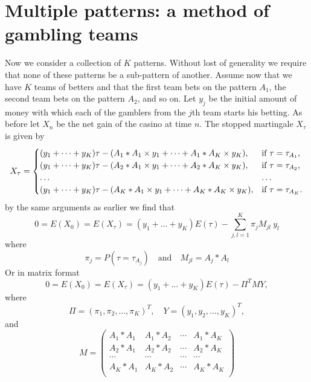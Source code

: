 \section{Multiple patterns: a method of gambling teams}
Now we consider a collection of $K$ patterns. Without lost of generality we
require that none of these patterns be a sub-pattern of another. Assume now that
we have $K$ teams of betters and that the first team bets on the pattern $A_1$,
the second team bets on the pattern $A_2$, and so on. Let $y_j$ be the initial
amount of money with which each of the gamblers from the $j$th team starts his
betting. As before let $X_n$ be the net gain of the casino at time $n$. The
stopped martingale $X_{\tau}$ is given by
\begin{equation}
  X_{\tau} =
    \begin{cases}
      (y_1+\dots +y_K)\tau -(A_1\ast A_1\times y_1 + \dots +A_1\ast A_K \times
        y_K),   &\text{if $\tau = \tau_{A_1}$,}   \\ 
      (y_1+\dots +y_K)\tau -(A_2\ast A_1\times y_1 + \dots +A_2\ast A_K \times
        y_K),   &\text{if $\tau = \tau_{A_2}$,}   \\ 
      \dots   &\text{\dots}  \\
      (y_1+\dots +y_K)\tau -(A_K\ast A_1\times y_1 + \dots +A_K\ast A_K \times
        y_K),   &\text{if $\tau = \tau_{A_K}$.}
    \end{cases}
\end{equation}
by the same arguments as earlier we find that
\begin{equation} 
  0=E(X_0)=E(X_{\tau}) = (y_1+\dots +y_K)E(\tau)
                         - \sum_{j,l=1}^K \pi_{j} M_{jl}\ y_l
\end{equation}
where 
\[
  \pi_j = P(\tau=\tau_{A_j}) \quad \text{and} \quad M_{jl}=A_j \ast A_l
\]
Or in matrix format
\begin{equation} \label{E:wait}
  0=E(X_0)=E(X_{\tau}) = (y_1+\dots +y_K)E(\tau)-\Pi^T M Y,
\end{equation}
where
\[
  \Pi=(\pi_1, \pi_2, \dots, \pi_K)^T, \quad Y=(y_1, y_2, \dots, y_K)^T,
\]
and
\begin{equation}
  M=
  \begin{pmatrix}
    A_1\ast A_1  &A_1\ast A_2  &\cdots  &A_1\ast A_K  \\ 
    A_2\ast A_1  &A_2\ast A_2  &\cdots  &A_2\ast A_K  \\ 
    \cdots       &\cdots       &\cdots  &\cdots       \\
    A_K\ast A_1  &A_K\ast A_2  &\cdots  &A_K\ast A_K  \\ 
  \end{pmatrix}
\end{equation}

